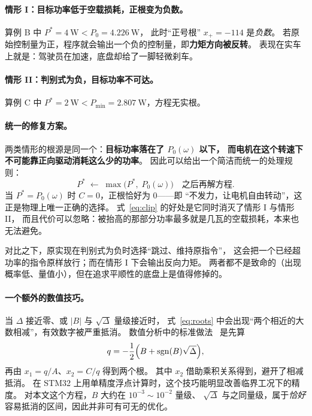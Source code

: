 \documentclass[cn,blue,11pt,device=normal]{elegantnote}
\newcommand{\fref}[1]{式~\eqref{#1}}
\begin{document}
\paragraph{情形 I：目标功率低于空载损耗，正根变为负数。}
算例 B 中 $P^{\ast}=4\ \mathrm{W} < P_0=4.226\ \mathrm{W}$，
此时“正号根” $x_+=-114$ 是\emph{负数}。
若原始控制量为正，程序就会输出一个负的控制量，即\textbf{力矩方向被反转}。
表现在实车上就是：驾驶员在加速，底盘却给了一脚轻微刹车。

\paragraph{情形 II：判别式为负，目标功率不可达。}
算例 C 中 $P^{\ast}=2\ \mathrm{W} < P_{\min}=2.807\ \mathrm{W}$，方程无实根。

\paragraph{统一的修复方案。}
两类情形的根源是同一个：\textbf{目标功率落在了 $P_0(\omega)$ 以下，
而电机在这个转速下不可能靠正向驱动消耗这么少的功率}。
因此可以给出一个简洁而统一的处理规则：
\begin{equation}\label{eq:clip}
  P^{\ast} \;\longleftarrow\; \max\bigl(P^{\ast},\; P_0(\omega)\bigr)
  \quad\text{之后再解方程} .
\end{equation}
当 $P^{\ast}=P_0(\omega)$ 时 $C=0$，正根恰好为 $0$——即
“不发力，让电机自由转动”，这正是物理上唯一正确的选择。
\fref{eq:clip} 的好处是它同时消灭了情形 I 与情形 II，
而且代价可以忽略：被抬高的那部分功率最多就是几瓦的空载损耗，本来也无法避免。

对比之下，原实现在判别式为负时选择“跳过、维持原指令”，
这会把一个已经超功率的指令原样放行；而在情形 I 下会输出反向力矩。
两者都不是致命的（出现概率低、量值小），但在追求平顺性的底盘上是值得修掉的。

\paragraph{一个额外的数值技巧。}
当 $\Delta$ 接近零、或 $|B|$ 与 $\sqrt{\Delta}$ 量级接近时，
\fref{eq:roots} 中会出现“两个相近的大数相减”，有效数字被严重抵消。
数值分析中的标准做法~\cite{press2007numerical} 是先算
\begin{equation}\label{eq:stabq}
  q = -\frac{1}{2}\Bigl(B + \operatorname{sgn}(B)\sqrt{\Delta}\Bigr),
\end{equation}
再由 $x_1 = q/A$、$x_2 = C/q$ 得到两个根。
其中 $x_2$ 借助乘积关系得到，避开了相减抵消。
在 STM32 上用单精度浮点计算时，这个技巧能明显改善临界工况下的精度。
对本文这个方程，$B$ 大约在 $10^{-3}\sim10^{-2}$ 量级、
$\sqrt\Delta$ 与之同量级，属于\emph{恰好}容易抵消的区间，因此并非可有可无的优化。
\end{document}
